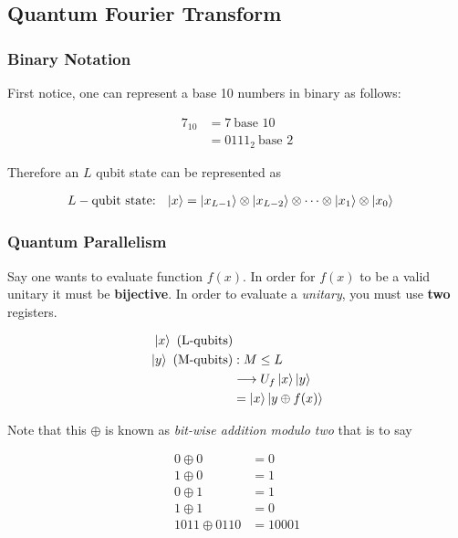 \documentclass[reprint, amsmath,amssymb, aps]{revtex4-2}
\begin{document}
        \subsection{Quantum Fourier Transform}
            \subsubsection{Binary Notation}
                First notice, one can represent a base 10 numbers in binary as follows:
            
                \begin{align*}
                    7_{10} &= 7 \ \text{base 10} \\
                    &= 0111_{2} \ \text{base 2}
                \end{align*}

                Therefore an $L$ qubit state can be represented as

                \begin{align*}
                L-\text{qubit state: } \ \ket{x} &= \ket{x_{L-1}} \otimes \ket{x_{L-2}} \otimes \cdots \otimes \ket{x_1}\otimes\ket{x_0}
                \end{align*}

                
            \subsubsection{Quantum Parallelism}
                Say one wants to evaluate function $f(x)$. In order for $f(x)$ to be a valid unitary it must be \textbf{bijective}. In order to evaluate a \textit{unitary}, you must use \textbf{two} registers.

                \begin{align*}
                \ket{x} \ (\text{L-qubits}) & \\
                \ket{y} \ (\text{M-qubits}) &: M\leq L \\
                &\longrightarrow U_f \ket{x}\ket{y} \\
                &= \ket{x}\ket{y\oplus f(x)}
                \end{align*}

                Note that this $\oplus$ is known as \textit{bit-wise addition modulo two} that is to say

                \begin{align*}
                0\oplus 0 &= 0\\
                1\oplus 0 &= 1\\
                0\oplus 1 &= 1\\
                1\oplus 1 &= 0\\
                1011 \oplus 0110 &= 10001 
                \end{align*}
\end{document}
